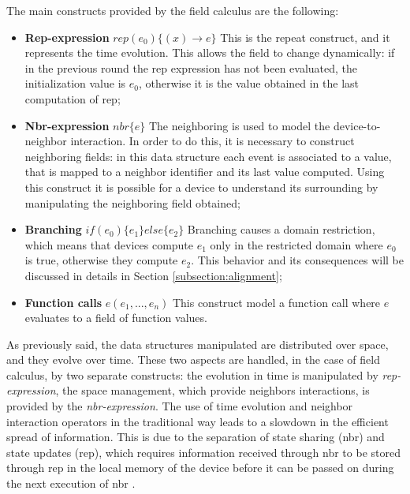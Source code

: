 The main constructs provided by the field calculus are the following:
\begin{itemize}
    \item \textbf{Rep-expression} $rep(e_0)\{(x) \rightarrow e\}$ \newline
    This is the repeat construct, and it represents the time evolution. This allows the field to change dynamically: if in the previous round the rep expression has not been evaluated, the initialization value is $e_0$, otherwise it is the value obtained in the last computation of rep;
    \item \textbf{Nbr-expression} $nbr\{e\}$\newline
    The neighboring is used to model the device-to-neighbor interaction. In order to do this, it is necessary to construct neighboring fields: in this data structure each event is associated to a value, that is mapped to a neighbor identifier and its last value computed. Using this construct it is possible for a device to understand its surrounding by manipulating the neighboring field obtained;
    \item \textbf{Branching} $if(e_0)\{e_1\} else \{e_2\}$\newline
    Branching causes a domain restriction, which means that devices compute $e_1$ only in the restricted domain where $e_0$ is true, otherwise they compute $e_2$. This behavior and its consequences will be discussed in details in Section \ref{subsection:alignment};
    \item \textbf{Function calls} $e(e_1, ..., e_n)$ \newline
    This construct model a function call where $e$ evaluates to a field of function values. 
\end{itemize}

As previously said, the data structures manipulated are distributed over space, and they evolve over time. These two aspects are handled, in the case of field calculus, by two separate constructs: the evolution in time is manipulated by \textit{rep-expression}, the space management, which provide neighbors interactions, is provided by the \textit{nbr-expression}.\newline
The use of time evolution and neighbor interaction operators in the traditional way leads to a slowdown in the efficient spread of information. This is due to the separation of state sharing (nbr) and state updates (rep), which requires information received through nbr to be stored through rep in the local memory of the device before it can be passed on during the next execution of nbr \cite{share_operator}. 

